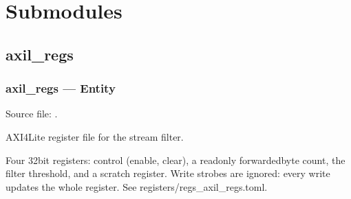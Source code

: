 \documentclass[letterpaper,10pt,english]{sphinxmanual}
\begin{document}
\section{Submodules}
\label{\detokenize{modules/top/index:submodules}}
\sphinxstepscope


\subsection{axil\_regs}
\label{\detokenize{modules/axil_regs/index:axil-regs}}\label{\detokenize{modules/axil_regs/index::doc}}
\sphinxstepscope


\subsubsection{axil\_regs — Entity}
\label{\detokenize{modules/axil_regs/entity:axil-regs-entity}}\label{\detokenize{modules/axil_regs/entity::doc}}
\sphinxAtStartPar
Source file: .

\sphinxAtStartPar
AXI4\sphinxhyphen{}Lite register file for the stream filter.

\sphinxAtStartPar
Four 32\sphinxhyphen{}bit registers: control (enable, clear), a read\sphinxhyphen{}only forwarded\sphinxhyphen{}byte
count, the filter threshold, and a scratch register. Write strobes are
ignored: every write updates the whole register. See registers/regs\_axil\_regs.toml.
\end{document}
